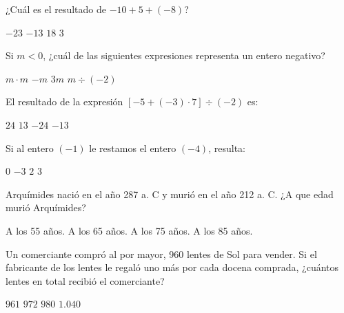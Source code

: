 \documentclass[spanish,letterpaper, 12pt, addpoints, answers]{exam}
\begin{document}
\begin{questions}


    \question[1] ¿Cuál es el resultado de $-10+5+(-8)$?

    \begin{choices}
        \choice $-23$
        \CorrectChoice $-13$
        \choice $18$
        \choice $3$
    \end{choices}

    \vspace{0.15in}

    \question[1] Si $m<0$, ¿cuál de las siguientes expresiones representa un entero negativo?

    \begin{choices}
        \choice $m\cdot m$
        \choice $-m$
        \CorrectChoice $3m$
        \choice $m\div (-2)$
    \end{choices}

    \vspace{0.15in}


    \question[1] El resultado de la expresión $\left[-5+(-3)\cdot 7\right]\div (-2)$ es:
    \begin{choices}
        \choice $24$
        \CorrectChoice $13$
        \choice $-24$
        \choice $-13$
    \end{choices}

    \vspace{0.15in}

    \setlength{\multicolsep}{0.5em}
    \question[1] Si al entero $(-1)$ le restamos el entero $(-4)$, resulta:

    \begin{choices}
        \choice $0$
        \choice $-3$
        \choice $2$
        \CorrectChoice $3$
    \end{choices}
    \vspace{0.15in}


\newpage
    \question[1] Arquímides nació en el año 287 a. C y murió en el año 212 a. C. ¿A que edad murió Arquímides?
    \begin{choices}
        \choice A los 55 años.
        \choice A los 65 años.
        \CorrectChoice A los 75 años.
        \choice A los 85 años.
    \end{choices}
    \vspace{0.15in}

    \question[1] Un comerciante compró al por mayor, 960 lentes de Sol para vender. Si el fabricante de los lentes le regaló uno más por cada docena comprada, ¿cuántos lentes en total recibió el comerciante?
    \begin{choices}
        \choice $961$
        \choice $972$
        \choice $980$
        \CorrectChoice $1.040$
    \end{choices}
    \vspace{0.15in}


\end{questions}
\end{document}
